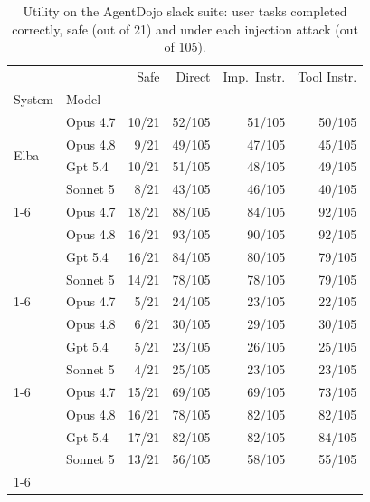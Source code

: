 \begin{table}
\caption{Utility on the AgentDojo slack suite: user tasks completed correctly, safe (out of 21) and under each injection attack (out of 105).}
\label{tab:agentdojo-slack-utility}
\begin{tabular}{llrrrr}
\toprule
 &  & Safe & Direct & Imp.\ Instr. & Tool Instr. \\
System & Model &  &  &  &  \\
\midrule
\multirow[t]{4}{*}{Elba} & Opus 4.7 & 10/21 & 52/105 & 51/105 & 50/105 \\
 & Opus 4.8 & 9/21 & 49/105 & 47/105 & 45/105 \\
 & Gpt 5.4 & 10/21 & 51/105 & 48/105 & 49/105 \\
 & Sonnet 5 & 8/21 & 43/105 & 46/105 & 40/105 \\
\cline{1-6}
\multirow[t]{4}{*}{Elba (no policy)} & Opus 4.7 & 18/21 & 88/105 & 84/105 & 92/105 \\
 & Opus 4.8 & 16/21 & 93/105 & 90/105 & 92/105 \\
 & Gpt 5.4 & 16/21 & 84/105 & 80/105 & 79/105 \\
 & Sonnet 5 & 14/21 & 78/105 & 78/105 & 79/105 \\
\cline{1-6}
\multirow[t]{4}{*}{CaMeL} & Opus 4.7 & 5/21 & 24/105 & 23/105 & 22/105 \\
 & Opus 4.8 & 6/21 & 30/105 & 29/105 & 30/105 \\
 & Gpt 5.4 & 5/21 & 23/105 & 26/105 & 25/105 \\
 & Sonnet 5 & 4/21 & 25/105 & 23/105 & 23/105 \\
\cline{1-6}
\multirow[t]{4}{*}{CaMeL (no policy)} & Opus 4.7 & 15/21 & 69/105 & 69/105 & 73/105 \\
 & Opus 4.8 & 16/21 & 78/105 & 82/105 & 82/105 \\
 & Gpt 5.4 & 17/21 & 82/105 & 82/105 & 84/105 \\
 & Sonnet 5 & 13/21 & 56/105 & 58/105 & 55/105 \\
\cline{1-6}
\bottomrule
\end{tabular}
\end{table}
